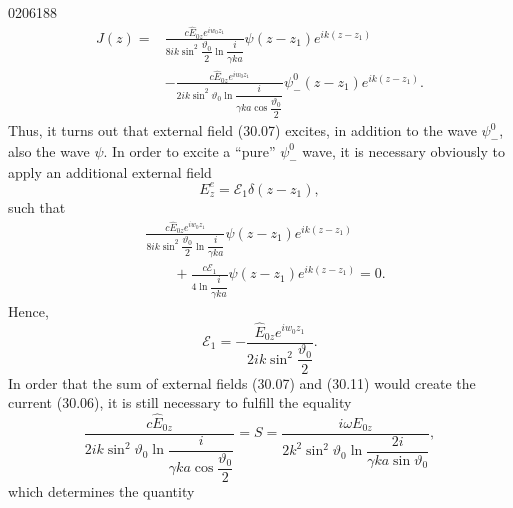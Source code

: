 \begin{scanpage}{0206}{188}
\[
\begin{aligned}
J(z)={}&\frac{c\hat E_{0z}e^{iw_0z_1}}{8ik\sin^2\dfrac{\vartheta_0}2\ln\dfrac{i}{\gamma ka}}\psi(z-z_1)e^{ik(z-z_1)}\\
&-\frac{c\hat E_{0z}e^{iw_0z_1}}{2ik\sin^2\vartheta_0\ln\dfrac{i}{\gamma ka\cos\dfrac{\vartheta_0}2}}\psi_-^0(z-z_1)e^{ik(z-z_1)}.
\end{aligned}\tag{30.10}
\]
Thus, it turns out that external field (30.07) excites, in addition to the wave $\psi_-^0$, also the wave $\psi$. In order to excite a ``pure'' $\psi_-^0$ wave, it is necessary obviously to apply an additional external field
\[E_z^e=\mathcal E_1\delta(z-z_1),\tag{30.11}\]
such that
\[
\begin{aligned}
&\frac{c\hat E_{0z}e^{iw_0z_1}}{8ik\sin^2\dfrac{\vartheta_0}2\ln\dfrac{i}{\gamma ka}}\psi(z-z_1)e^{ik(z-z_1)}\\
&\qquad+\frac{c\mathcal E_1}{4\ln\dfrac{i}{\gamma ka}}\psi(z-z_1)e^{ik(z-z_1)}=0.
\end{aligned}\tag{30.12}
\]
Hence,
\[\mathcal E_1=-\frac{\hat E_{0z}e^{iw_0z_1}}{2ik\sin^2\dfrac{\vartheta_0}2}.\tag{30.13}\]
In order that the sum of external fields (30.07) and (30.11) would create the current (30.06), it is still necessary to fulfill the equality
\[
\frac{c\hat E_{0z}}{2ik\sin^2\vartheta_0\ln\dfrac{i}{\gamma ka\cos\dfrac{\vartheta_0}2}}
=S=\frac{i\omega E_{0z}}{2k^2\sin^2\vartheta_0\ln\dfrac{2i}{\gamma ka\sin\vartheta_0}},\tag{30.14}
\]
which determines the quantity
\end{scanpage}
